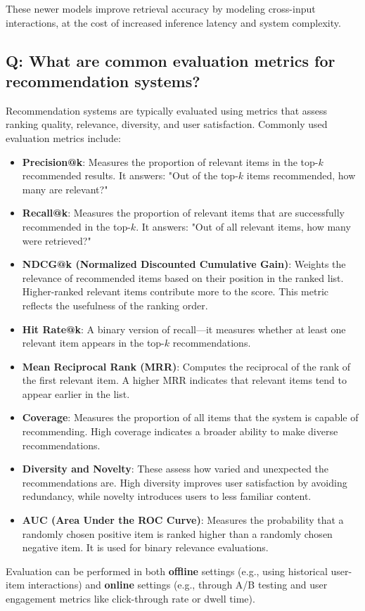 \documentclass[11pt]{article}
\begin{document}
These newer models improve retrieval accuracy by modeling cross-input interactions, at the cost of increased inference latency and system complexity.

\subsection*{Q: What are common evaluation metrics for recommendation systems?}
Recommendation systems are typically evaluated using metrics that assess ranking quality, relevance, diversity, and user satisfaction. Commonly used evaluation metrics include:

\begin{itemize}
	\item \textbf{Precision@k}: Measures the proportion of relevant items in the top-\(k\) recommended results. It answers: "Out of the top-\(k\) items recommended, how many are relevant?"

	\item \textbf{Recall@k}: Measures the proportion of relevant items that are successfully recommended in the top-\(k\). It answers: "Out of all relevant items, how many were retrieved?"

	\item \textbf{NDCG@k (Normalized Discounted Cumulative Gain)}: Weights the relevance of recommended items based on their position in the ranked list. Higher-ranked relevant items contribute more to the score. This metric reflects the usefulness of the ranking order.

	\item \textbf{Hit Rate@k}: A binary version of recall—it measures whether at least one relevant item appears in the top-\(k\) recommendations.

	\item \textbf{Mean Reciprocal Rank (MRR)}: Computes the reciprocal of the rank of the first relevant item. A higher MRR indicates that relevant items tend to appear earlier in the list.

	\item \textbf{Coverage}: Measures the proportion of all items that the system is capable of recommending. High coverage indicates a broader ability to make diverse recommendations.

	\item \textbf{Diversity and Novelty}: These assess how varied and unexpected the recommendations are. High diversity improves user satisfaction by avoiding redundancy, while novelty introduces users to less familiar content.

	\item \textbf{AUC (Area Under the ROC Curve)}: Measures the probability that a randomly chosen positive item is ranked higher than a randomly chosen negative item. It is used for binary relevance evaluations.

\end{itemize}

Evaluation can be performed in both \textbf{offline} settings (e.g., using historical user-item interactions) and \textbf{online} settings (e.g., through A/B testing and user engagement metrics like click-through rate or dwell time).
\end{document}
